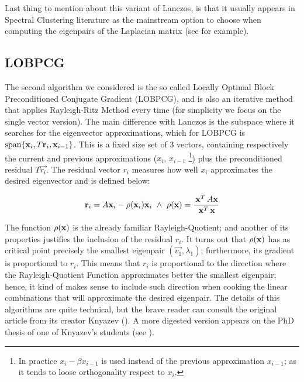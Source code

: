 Last thing to mention about this variant of Lanczos, is that it
usually appears in Spectral Clustering literature as the mainstream
option to choose when computing the eigenpairs of the
\gls{Laplacian} matrix (see \cite{luxburg07} for example). 

\subsection{\gls{LOBPCG}}

The second algorithm we considered is the so called Locally Optimal
Block Preconditioned Conjugate Gradient (\gls{LOBPCG}), and is also an
iterative method that applies Rayleigh-Ritz Method every time (for
simplicity we focus on the single vector version). The main difference
with Lanczos is the subspace where it searches for the eigenvector
approximations, which for \gls{LOBPCG} is $\operatorname{span} \{\mathbf{x}_i,
T\mathbf{r}_i, \mathbf{x}_{i-1}\}$. This is a fixed size set of 3 vectors,
containing respectively the current and previous approximations
($x_i$, $x_{i-1}$ \footnote{In practice $x_{i} - \beta x_{i-1}$ is used
  instead of the previous approximation $x_{i-1}$; as it tends to
  loose orthogonality respect to $x_i$.}) plus the preconditioned
residual $T\vec{r_i}$. The residual vector $r_i$ measures how well
$x_i$ approximates the desired eigenvector and is defined below:

\begin{equation*}
    \joinabove{0}
    \vec{r}_i = A\vec{x}_i - \func{\rho}(\vec{x}_i)\vec{x}_i
    \ds{\land}
    \func{\rho}(\vec{x}) = \dfrac{\trans{\vec{x}}A\vec{x}}{\trans{\vec{x}}\vec{x}}
\end{equation*}
\joinbelow{1cm}

The function $\operatorname{\rho}(\mathbf{x})$ is the already familiar 
Rayleigh-Quotient; and another of its properties justifies the
inclusion of the residual $r_i$. It turns out that
$\operatorname{\rho}(\mathbf{x})$ has as critical point precisely the smallest
eigenpair $(\vec{v_1},\lambda_1)$; furthermore, its gradient is
proportional to $r_i$. This means that $r_i$ is proportional to the
direction where the Rayleigh-Quotient Function approximates better
the smallest eigenpair; hence, it kind of makes sense to include such
direction when cooking the linear combinations that will approximate
the desired eigenpair. The details of this algorithms are quite
technical, but the brave reader can consult the original article from
its creator Knyazev (\cite{knyazev01}). A more digested version
appears on the PhD thesis of one of Knyazev's students (see
\cite{lashuk07}).  \\ 

